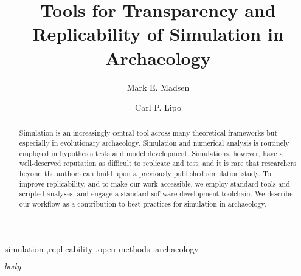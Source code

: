 \documentclass[preprint,times,authoryear,10pt]{elsarticle}
\begin{document}
\begin{frontmatter}


\title{Tools for Transparency and Replicability of Simulation in Archaeology}

\author{Mark E. Madsen}
\address{Department of Anthropology, Box 353100, University of Washington, Seattle WA, 98195 USA}

\author{Carl P. Lipo}
\address{Department of Anthropology and IIRMES, 1250 Bellflower Blvd, California State University at Long Beach, Long Beach CA, 90840 USA}


\begin{abstract}
Simulation is an increasingly central tool across many theoretical frameworks but especially in evolutionary archaeology. Simulation and numerical analysis is routinely employed in hypothesis tests and model development. Simulations, however, have a well-deserved reputation as difficult to replicate and test, and it is rare that researchers beyond the authors can build upon a previously published simulation study. To improve replicability, and to make our work accessible, we employ standard tools and scripted analyses, and engage a standard software development toolchain. We describe our workflow as a contribution to best practices for simulation in archaeology.

\end{abstract}

\begin{keyword}
simulation \sep replicability \sep open methods \sep archaeology
\end{keyword}


\end{frontmatter}

$body$





\end{document}
